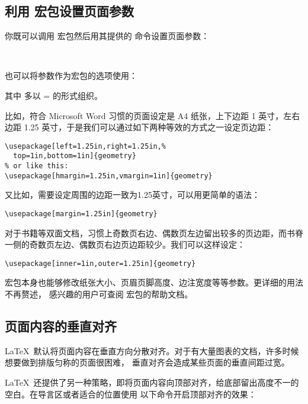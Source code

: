 \subsection{利用  宏包设置页面参数}

你既可以调用  宏包然后用其提供的  命令设置页面参数：
\begin{command}
 \\
\end{command}
也可以将参数作为宏包的选项使用：
\begin{command}
\end{command}

其中  多以 = 的形式组织。

比如，符合 Microsoft Word 习惯的页面设定是 A4 纸张，上下边距 1 英寸，左右边距 1.25 英寸，于是我们可以通过如下两种等效的方式之一设定页边距：
\begin{verbatim}
\usepackage[left=1.25in,right=1.25in,%
  top=1in,bottom=1in]{geometry}
% or like this:
\usepackage[hmargin=1.25in,vmargin=1in]{geometry}
\end{verbatim}

又比如，需要设定周围的边距一致为1.25英寸，可以用更简单的语法：
\begin{verbatim}
\usepackage[margin=1.25in]{geometry}
\end{verbatim}

对于书籍等双面文档，习惯上奇数页右边、偶数页左边留出较多的页边距，而书脊一侧的奇数页左边、偶数页右边页边距较少。我们可以这样设定：
\begin{verbatim}
\usepackage[inner=1in,outer=1.25in]{geometry}
\end{verbatim}

 宏包本身也能够修改纸张大小、页眉页脚高度、边注宽度等等参数。更详细的用法不再赘述，
感兴趣的用户可查阅  宏包的帮助文档。

\subsection{页面内容的垂直对齐}

\LaTeX\ 默认将页面内容在垂直方向分散对齐。对于有大量图表的文档，许多时候想要做到排版匀称的页面很困难，
垂直对齐会造成某些页面的垂直间距过宽。

\LaTeX\ 还提供了另一种策略，即将页面内容向顶部对齐，给底部留出高度不一的空白。在导言区或者适合的位置使用
以下命令开启顶部对齐的效果：
\begin{command}
\end{command}

